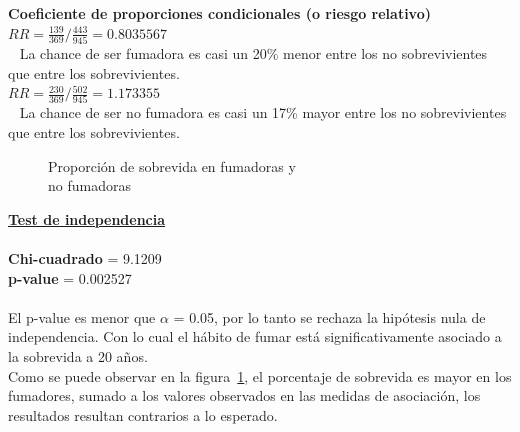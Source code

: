\documentclass[12pt,letterpaper,fleqn]{article}
\begin{document}
\begin{enumerate}[label=\textbf{\arabic*.}]
\begin{enumerate}[label=\textbf{\alph*.}]
                    \textbf{Coeficiente de proporciones condicionales (o riesgo relativo)}\\
                     $ RR =  \frac{139}{369}/\frac{443}{945} = 0.8035567 $ \\ 
                     La chance de ser fumadora es casi un 20\% menor entre los no sobrevivientes que entre los sobrevivientes.\\
                     $ RR =  \frac{230}{369}/\frac{502}{945} = 1.173355 $ \\ 
                     La chance de ser no fumadora es casi un 17\% mayor entre los no sobrevivientes que entre los sobrevivientes.\\


                    \begin{figure}[!h]
                        \centering
                        
                        \caption{Proporción de sobrevida en fumadoras y \\no fumadoras}
                        \label{fig:figure1}
                    \end{figure}

                    \underline{\textbf{Test de independencia}} \\ \\
                    \textbf{Chi-cuadrado} = 9.1209 \\
                    \textbf{p-value} = 0.002527 \\ \\
                     El p-value es menor que $\alpha$ = 0.05, por lo tanto se rechaza la hipótesis nula de independencia. Con lo cual el hábito de fumar está significativamente asociado a la sobrevida a 20 años. \\
                    Como se puede observar en la figura~\ref{fig:figure1}, el porcentaje de sobrevida es mayor en los fumadores, sumado a los valores observados en las medidas de asociación, los resultados resultan contrarios a lo esperado.


\end{enumerate}
\end{enumerate}
\end{document}
